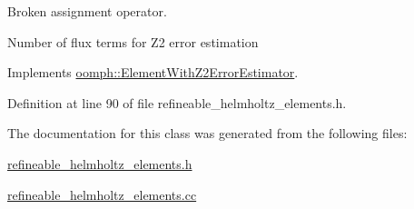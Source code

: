 Broken assignment operator. 

Number of \textquotesingle{}flux\textquotesingle{} terms for Z2 error estimation 

Implements \hyperlink{classoomph_1_1ElementWithZ2ErrorEstimator_ae82c5728902e13da31be19c390fc28e3}{oomph\+::\+Element\+With\+Z2\+Error\+Estimator}.



Definition at line 90 of file refineable\+\_\+helmholtz\+\_\+elements.\+h.



The documentation for this class was generated from the following files\+:\begin{DoxyCompactItemize}
\item 
\hyperlink{refineable__helmholtz__elements_8h}{refineable\+\_\+helmholtz\+\_\+elements.\+h}\item 
\hyperlink{refineable__helmholtz__elements_8cc}{refineable\+\_\+helmholtz\+\_\+elements.\+cc}\end{DoxyCompactItemize}
